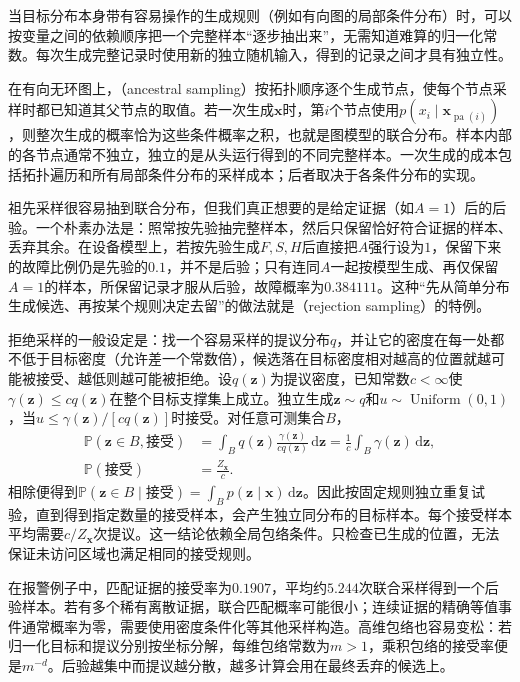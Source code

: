当目标分布本身带有容易操作的生成规则（例如有向图的局部条件分布）时，可以按变量之间的依赖顺序把一个完整样本“逐步抽出来”，无需知道难算的归一化常数。每次生成完整记录时使用新的独立随机输入，得到的记录之间才具有独立性。

在有向无环图上，（ancestral sampling）按拓扑顺序逐个生成节点，使每个节点采样时都已知道其父节点的取值。若一次生成$\bm{x}$时，第$i$个节点使用$p(x_i\mid\bm{x}_{\operatorname{pa}(i)})$，则整次生成的概率恰为这些条件概率之积，也就是图模型的联合分布。样本内部的各节点通常不独立，独立的是从头运行得到的不同完整样本。一次生成的成本包括拓扑遍历和所有局部条件分布的采样成本；后者取决于各条件分布的实现。

祖先采样很容易抽到联合分布，但我们真正想要的是给定证据（如$A=1$）后的后验。一个朴素办法是：照常按先验抽完整样本，然后只保留恰好符合证据的样本、丢弃其余。在设备模型上，若按先验生成$F,S,H$后直接把$A$强行设为$1$，保留下来的故障比例仍是先验的$0.1$，并不是后验；只有连同$A$一起按模型生成、再仅保留$A=1$的样本，所保留记录才服从后验，故障概率为$0.384111$。这种“先从简单分布生成候选、再按某个规则决定去留”的做法就是（rejection sampling）的特例。

拒绝采样的一般设定是：找一个容易采样的提议分布$q$，并让它的密度在每一处都不低于目标密度（允许差一个常数倍），候选落在目标密度相对越高的位置就越可能被接受、越低则越可能被拒绝。设$q(\bm{z})$为提议密度，已知常数$c<\infty$使$\gamma(\bm{z})\leq c q(\bm{z})$在整个目标支撑集上成立。独立生成$\bm{z}\sim q$和$u\sim\operatorname{Uniform}(0,1)$，当$u\leq\gamma(\bm{z})/[c q(\bm{z})]$时接受。对任意可测集合$B$，
\begin{equation}
  \begin{aligned}
    \mathbb{P}(\bm{z}\in B,\text{接受})
      &=\int_B q(\bm{z})\frac{\gamma(\bm{z})}{c q(\bm{z})}
        \,\mathrm{d}\bm{z}
        =\frac{1}{c}\int_B\gamma(\bm{z})\,\mathrm{d}\bm{z},\\
    \mathbb{P}(\text{接受})&=\frac{Z_{\bm{x}}}{c}.
  \end{aligned}
  \label{eq:pgm-sampling-rejection}
\end{equation}
相除便得到$\mathbb{P}(\bm{z}\in B\mid\text{接受})=\int_B p(\bm{z}\mid\bm{x})\,\mathrm{d}\bm{z}$。因此按固定规则独立重复试验，直到得到指定数量的接受样本，会产生独立同分布的目标样本。每个接受样本平均需要$c/Z_{\bm{x}}$次提议。这一结论依赖全局包络条件。只检查已生成的位置，无法保证未访问区域也满足相同的接受规则。

在报警例子中，匹配证据的接受率为$0.1907$，平均约$5.244$次联合采样得到一个后验样本。若有多个稀有离散证据，联合匹配概率可能很小；连续证据的精确等值事件通常概率为零，需要使用密度条件化等其他采样构造。高维包络也容易变松：若归一化目标和提议分别按坐标分解，每维包络常数为$m>1$，乘积包络的接受率便是$m^{-d}$。后验越集中而提议越分散，越多计算会用在最终丢弃的候选上。

